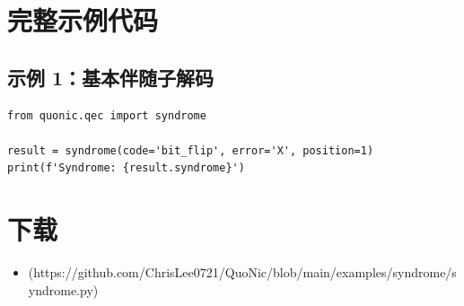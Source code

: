 \documentclass[12pt,a4paper]{article}
\begin{document}
\section{完整示例代码}

\subsection{示例 1：基本伴随子解码}

\begin{verbatim}
from quonic.qec import syndrome

result = syndrome(code='bit_flip', error='X', position=1)
print(f'Syndrome: {result.syndrome}')
\end{verbatim}

\section{下载}

\begin{itemize}
  \item [syndrome.py](https://github.com/ChrisLee0721/QuoNic/blob/main/examples/syndrome/syndrome.py)
\end{itemize}
\end{document}
